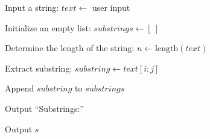 \begin{algorithm}
\caption{Generate All Possible Substrings of a String}
\begin{algorithmic}[1]

\STATE Input a string:
\STATE $text \gets$ user input

\STATE Initialize an empty list:
\STATE $substrings \gets [\ ]$

\STATE Determine the length of the string:
\STATE $n \gets \text{length}(text)$

        \STATE Extract substring:
        \STATE $substring \gets text[i:j]$
        
        \STATE Append $substring$ to $substrings$
    \ENDFOR
\ENDFOR

\STATE Output ``Substrings:''

    \STATE Output $s$
\ENDFOR

\end{algorithmic}
\end{algorithm}